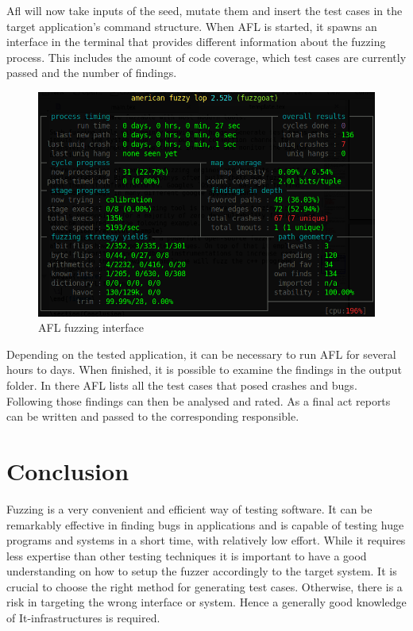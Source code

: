 \documentclass[journal=tosc,final]{iacrtrans}
\begin{document}
Afl will now take inputs of the seed, mutate them and insert the test cases in the target application’s command structure.
When AFL is started, it spawns an interface in the terminal that provides different information about the fuzzing process. This includes the amount of code coverage, which test cases are currently passed and the number of findings. 
\begin{figure}[h]
 \caption{AFL fuzzing interface}
 \begin{center}
   \includegraphics[scale=0.35]{afl.png}

 \end{center}
\end{figure}

Depending on the tested application, it can be necessary to run AFL for several hours to days. When finished, it is possible to examine the findings in the output folder. In there AFL lists all the test cases that posed crashes and bugs. Following those findings can then be analysed and rated. As a final act reports can be written and passed to the corresponding responsible.


\section{Conclusion}
Fuzzing is a very convenient and efficient way of testing software. It can be remarkably effective in finding bugs in applications and is capable of testing huge programs and systems in a short time, with relatively low effort. While it requires less expertise than other testing techniques it is important to have a good understanding on how to setup the fuzzer accordingly to the target system. It is crucial to choose the right method for generating test cases. Otherwise, there is a risk in targeting the wrong interface or system. Hence a generally good knowledge of It-infrastructures is required.
\end{document}
